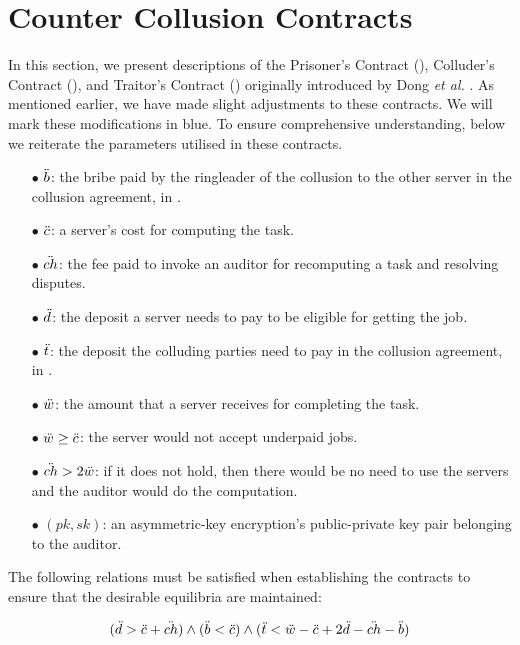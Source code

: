

\section{Counter Collusion Contracts}\label{appendix::Counter-Collusion-Contracts}

In this section, we  present descriptions of the Prisoner’s Contract (\SCpc), Colluder’s Contract (\SCcc), and Traitor’s Contract (\SCtc) originally introduced by Dong \textit{et al.} \cite{dong2017betrayal}. As mentioned earlier, we have made slight adjustments to these contracts. We will mark these modifications in blue. To ensure comprehensive understanding, below we reiterate the parameters utilised in these contracts.




\begin{itemize}
\item[$\bullet$] $\ddot{b}$: the bribe paid by the ringleader of the collusion to the other
server in the collusion agreement, in \SCcc.
%
\item[$\bullet$] $\ddot{c}$: a server’s cost for computing the task.
%
\item[$\bullet$] $\ddot{ch}$: the fee paid to invoke an auditor for recomputing a task and resolving
disputes.
%
\item[$\bullet$] $\ddot{d}$: the deposit a server needs to pay to be eligible for getting the job.
%
\item[$\bullet$] $\ddot{t}$: the deposit the colluding parties need to pay in the collusion agreement, in \SCcc.
%
\item[$\bullet$] $\ddot{w}$: the amount that a server receives for completing the task.
%
\item[$\bullet$] $\ddot{w} \geq \ddot{c}$: the server would not accept underpaid jobs.
%
\item[$\bullet$] $\ddot{ch} > 2\ddot{w}$: if it does not hold, then there would be no need to use the servers and the auditor would do the computation.
%
\item [$\bullet$] $(pk,sk)$: an asymmetric-key encryption's public-private key pair belonging to the auditor. 
\end{itemize}

The following relations must be satisfied when establishing the contracts to ensure that the desirable equilibria are maintained:

\vspace{-1.5mm}
 $$(\ddot{d}>\ddot{c}+\ddot{ch}) \wedge (\ddot{b}<\ddot{c}) \wedge (\ddot{t}<\ddot{w}-\ddot{c} + 2\ddot{d} - \ddot{ch} -\ddot{b})$$











